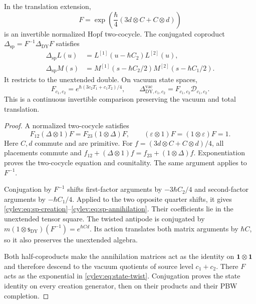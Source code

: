\begin{theorem}\label{cylev:thm:twist}
In the translation extension,
\begin{equation}\label{cylev:eq:twist}
 F=\exp\!\left(\frac{\hbar}{4}(3d\otimes C+C\otimes d)\right)
\end{equation}
is an invertible normalized Hopf two-cocycle.
The conjugated coproduct $\Delta_{\mathrm{sp}}=F^{-1}\Delta_{\mathrm{DY}}F$
satisfies
\begin{align}
 \Delta_{\mathrm{sp}}L(u)&=L^{[1]}(u-\hbar C_2)L^{[2]}(u),
       \label{cylev:eq:sp-creation}\\
 \Delta_{\mathrm{sp}}M(s)&=M^{[1]}(s-\hbar C_2/2)
                              M^{[2]}(s-\hbar C_1/2).
       \label{cylev:eq:sp-annihilation}
\end{align}
It restricts to the unextended double.
On vacuum state spaces,
\begin{equation}\label{cylev:eq:state-twist}
 F_{c_1,c_2}=e^{\hbar(3c_2T_1+c_1T_2)/4},\qquad
 \Delta^{\mathrm{vac}}_{\mathrm{DY},c_1,c_2}
       =F_{c_1,c_2}\mathscr D_{c_1,c_2}.
\end{equation}
This is a continuous invertible comparison preserving the vacuum
and total translation.
\end{theorem}
\begin{proof}
A normalized two-cocycle satisfies
\[
 F_{12}(\Delta\otimes1)F=F_{23}(1\otimes\Delta)F,
 \qquad(\varepsilon\otimes1)F=(1\otimes\varepsilon)F=1.
\]
Here $C,d$ commute and are primitive.
For $f=(3d\otimes C+C\otimes d)/4$, all placements commute and
$f_{12}+(\Delta\otimes1)f=f_{23}+(1\otimes\Delta)f$.
Exponentiation proves the two-cocycle equation and counitality.
The same argument applies to $F^{-1}$.

Conjugation by $F^{-1}$ shifts first-factor arguments by
$-3\hbar C_2/4$ and second-factor arguments by $-\hbar C_1/4$.
Applied to the two opposite quarter shifts, it gives
\eqref{cylev:eq:sp-creation}--\eqref{cylev:eq:sp-annihilation}.
Their coefficients lie in the unextended tensor square.
The twisted antipode is conjugated by
$m(1\otimes\mathsf s_{\mathrm{DY}})(F^{-1})=e^{\hbar Cd}$.
Its action translates both matrix arguments by $\hbar C$, so it
also preserves the unextended algebra.

Both half-coproducts make the annihilation matrices act as the identity
on $\mathbf1\otimes\mathbf1$ and therefore descend to the vacuum
quotients of source level $c_1+c_2$.
There $F$ acts as the exponential in \eqref{cylev:eq:state-twist}.
Conjugation proves the state identity on every creation generator,
then on their products and their PBW completion.
\end{proof}

